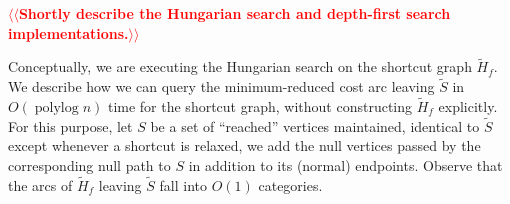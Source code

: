 \documentclass[a4paper,UKenglish]{socg-lipics-v2018}
\makeatletter
\def\note#1{\textcolor{red}{{#1}}}
\def\polylog{\mathop{\mathrm{polylog}}}
\def\eps{\varepsilon}
\DeclareMathOperator*{\argmin}{arg\,min}
\def\fsupply{\phi}
\theoremstyle{plain}
\numberwithin{figure}{section}
\def\EMPH#1{\textbf{\emph{\boldmath #1}}}
\def\n@te#1{\textsf{\boldmath \textbf{$\langle\!\langle$#1$\rangle\!\rangle$}}\leavevmode}
\def\note#1{\textcolor{red}{\n@te{#1}}}
\makeatother
\begin{document}


\note{Shortly describe the Hungarian search and depth-first search implementations.}

Conceptually, we are executing the Hungarian search
on the shortcut graph $\tilde{H}_f$.
We describe how we can query the minimum-reduced cost arc leaving $\tilde{S}$ in
$O(\polylog n)$ time for the shortcut graph, without constructing
$\tilde{H}_f$ explicitly.
For this purpose, let \EMPH{$S$} be a set of ``reached'' vertices maintained,
identical to $\tilde{S}$ except whenever a shortcut is relaxed, we add the null vertices passed by the corresponding null path to $S$ in addition to its (normal) endpoints.
%
Observe that the arcs of $\tilde{H}_f$ leaving $\tilde{S}$ fall into $O(1)$ categories.
\end{document}
